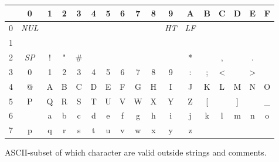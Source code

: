 \documentclass[a4paper]{article}
\begin{document}
			\begin{figure}[h]
				\centering

				\caption{ASCII-subset of which character are valid outside strings and comments.}
				\label{fig:characters}
				\begin{tabular}{|c|c c c c c c c c c c c c c c c c|}
					\hline
					{} & 0 & 1 & 2 & 3 & 4 & 5 & 6 & 7 & 8 & 9 & A & B & C & D & E & F \\
					\hline
					0 & \textit{NUL} & {} & {} & {} & {} & {} & {} & {} & {} & \textit{HT} & \textit{LF} & {} & {} & {} & {} & {} \\
					1 & {} & {} & {} & {} & {} & {} & {} & {} & {} & {} & {} & {} & {} & {} & {} & {} \\
					2 & \textit{SP} & ! & " & \# & {} & {} & {} & {} & {} & {} & * & {} & , & {} & . & {} \\
					3 & 0 & 1 & 2 & 3 & 4 & 5 & 6 & 7 & 8 & 9 & : & ; & < & {} & > & {} \\
					4 & @ & A & B & C & D & E & F & G & H & I & J & K & L & M & N & O \\
					5 & P & Q & R & S & T & U & V & W & X & Y & Z & [ & {} & ] & {} & \_ \\
					6 & {} & a & b & c & d & e & f & g & h & i & j & k & l & m & n & o \\
					7 & p & q & r & s & t & u & v & w & x & y & z & {} & {} & {} & {} & {} \\
					\hline
				\end{tabular}
			\end{figure}
\end{document}
